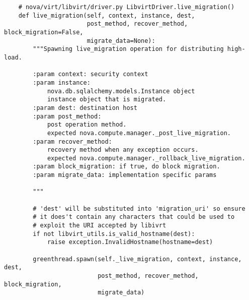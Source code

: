 \documentclass[a4paper,left=1.5cm,right=1.5cm,11pt]{article}
\begin{document}
    \begin{lstlisting}
    # nova/virt/libvirt/driver.py LibvirtDriver.live_migration()
    def live_migration(self, context, instance, dest,
                       post_method, recover_method, block_migration=False,
                       migrate_data=None):
        """Spawning live_migration operation for distributing high-load.

        :param context: security context
        :param instance:
            nova.db.sqlalchemy.models.Instance object
            instance object that is migrated.
        :param dest: destination host
        :param post_method:
            post operation method.
            expected nova.compute.manager._post_live_migration.
        :param recover_method:
            recovery method when any exception occurs.
            expected nova.compute.manager._rollback_live_migration.
        :param block_migration: if true, do block migration.
        :param migrate_data: implementation specific params

        """

        # 'dest' will be substituted into 'migration_uri' so ensure
        # it does't contain any characters that could be used to
        # exploit the URI accepted by libivrt
        if not libvirt_utils.is_valid_hostname(dest):
            raise exception.InvalidHostname(hostname=dest)

        greenthread.spawn(self._live_migration, context, instance, dest,
                          post_method, recover_method, block_migration,
                          migrate_data)
    \end{lstlisting}
\end{document}
